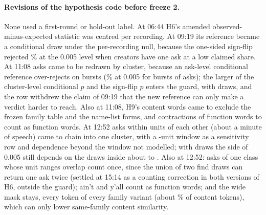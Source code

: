 \paragraph{Revisions of the hypothesis code before freeze 2.} None used a first-round or hold-out label. At 06:44 H6's
amended observed-minus-expected statistic was centred per recording. At 09:19 its reference became a conditional draw
under the per-recording null, because the one-sided sign-flip rejected \HSixSignFlipRejectPct\% at the 0.005 level when
creators have one ask at a low claimed share. At 11:08 asks came to be redrawn by cluster, because an ask-level
conditional reference over-rejects on bursts (\HSixBurstRejectPct\% at 0.005 for bursts of \HSixBurstSize{} asks); the
larger of the cluster-level conditional $p$ and the sign-flip $p$ enters the guard, with \HSixDraws{} draws, and the
row withdrew the claim of 09:19 that the new reference can only make a verdict harder to reach. Also at 11:08, H9's
content words came to exclude the frozen family table and the name-list forms, and contractions of function words to
count as function words. At 12:52 asks within \HSixClusterUnits{} units of each other (about a minute of speech) came to
chain into one cluster, with a \HSixClusterSensUnits-unit window as a sensitivity row and dependence beyond the window
not modelled; with \HSixDraws{} draws the side of 0.005 still depends on the draws inside about \HSixPBandLo{} to
\HSixPBandHi. Also at 12:52: asks of one class whose unit ranges overlap count once, since the union of two find draws
can return one ask twice (settled at 15:14 as a counting correction in both versions of H6, outside the guard); ain't
and y'all count as function words; and the wide mask stays, every token of every family variant (about \HNineMaskPct\%
of content tokens), which can only lower same-family content similarity.

